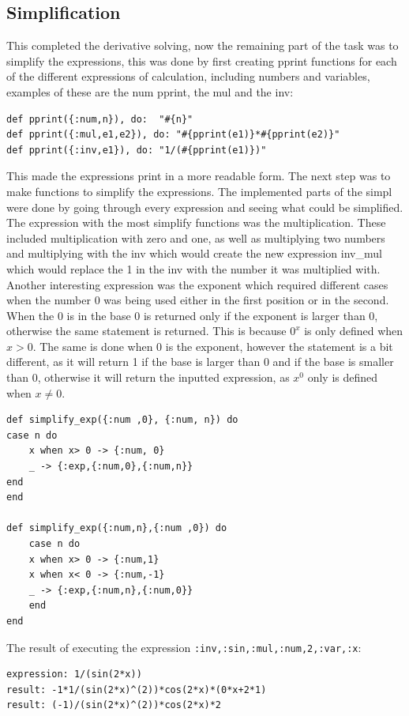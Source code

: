 \documentclass[a4paper,11pt]{article}
\begin{document}
\subsection*{Simplification}
This completed the derivative solving, now the remaining part of the task was to simplify the expressions, this was done by first creating pprint functions for each of the different expressions of calculation, including numbers and variables, examples of these are the num pprint, the mul and the inv:
\begin{verbatim}
def pprint({:num,n}), do:  "#{n}"
def pprint({:mul,e1,e2}), do: "#{pprint(e1)}*#{pprint(e2)}"
def pprint({:inv,e1}), do: "1/(#{pprint(e1)})"
\end{verbatim}
This made the expressions print in a more readable form. The next step was to make functions to simplify the expressions. The implemented parts of the simpl were done by going through every expression and seeing what could be simplified. The expression with the most simplify functions was the multiplication. These included multiplication with zero and one, as well as multiplying two numbers and multiplying with the inv which would create the new expression inv\_mul which would replace the 1 in the inv with the number it was multiplied with. 
Another interesting expression was the exponent which required different cases when the number 0 was being used either in the first position or in the second. When the 0 is in the base 0 is returned only if the exponent is larger than 0, otherwise the same statement is returned. This is because $ 0^x $ is only defined when $x >0$. The same is done when 0 is the exponent, however the statement is a bit different, as it will return 1 if the base is larger than 0 and  if the base is smaller than 0, otherwise it will return the inputted expression, as $ x^0 $ only is defined when $x \neq0$.
\begin{verbatim}
def simplify_exp({:num ,0}, {:num, n}) do
case n do
    x when x> 0 -> {:num, 0}
    _ -> {:exp,{:num,0},{:num,n}}
end
end

def simplify_exp({:num,n},{:num ,0}) do
    case n do
    x when x> 0 -> {:num,1}
    x when x< 0 -> {:num,-1}
    _ -> {:exp,{:num,n},{:num,0}}
    end
end
\end{verbatim}
The result of executing the 
expression \texttt{{:inv,{:sin,{:mul,{:num,2},{:var,:x}}}}}:



\begin{verbatim}
expression: 1/(sin(2*x))
result: -1*1/(sin(2*x)^(2))*cos(2*x)*(0*x+2*1)
result: (-1)/(sin(2*x)^(2))*cos(2*x)*2
\end{verbatim}
\noindent
\end{document}
